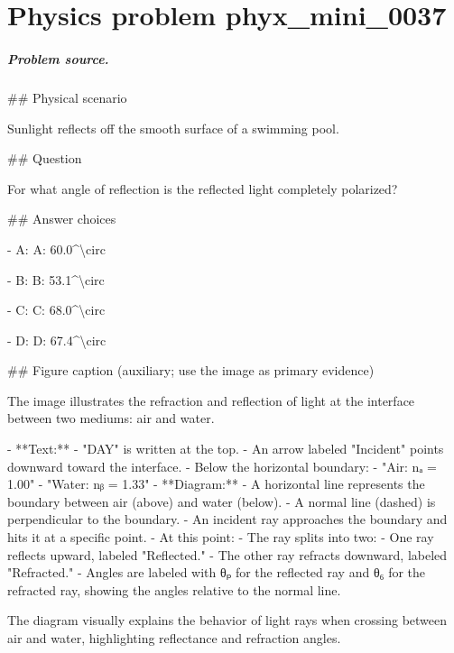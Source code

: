 
\chapter{Physics problem phyx\_mini\_0037}
\label{ch:PhyXMiniProblems_problem_phyx_mini_0037}

\paragraph{Problem source.}
\#\# Physical scenario

Sunlight reflects off the smooth surface of a swimming pool.

\#\# Question

For what angle of reflection is the reflected light completely polarized?

\#\# Answer choices

- A: A: 60.0\textasciicircum{}\textbackslash{}circ

- B: B: 53.1\textasciicircum{}\textbackslash{}circ

- C: C: 68.0\textasciicircum{}\textbackslash{}circ

- D: D: 67.4\textasciicircum{}\textbackslash{}circ

\#\# Figure caption (auxiliary; use the image as primary evidence)

The image illustrates the refraction and reflection of light at the interface between two mediums: air and water. 

- **Text:**
  - "DAY" is written at the top.
  - An arrow labeled "Incident" points downward toward the interface.
  - Below the horizontal boundary:
    - "Air: nₐ = 1.00"
    - "Water: nᵦ = 1.33"
- **Diagram:**
  - A horizontal line represents the boundary between air (above) and water (below).
  - A normal line (dashed) is perpendicular to the boundary.
  - An incident ray approaches the boundary and hits it at a specific point.
  - At this point:
    - The ray splits into two:
      - One ray reflects upward, labeled "Reflected."
      - The other ray refracts downward, labeled "Refracted."
  - Angles are labeled with θₚ for the reflected ray and θ₆ for the refracted ray, showing the angles relative to the normal line.

The diagram visually explains the behavior of light rays when crossing between air and water, highlighting reflectance and refraction angles.

